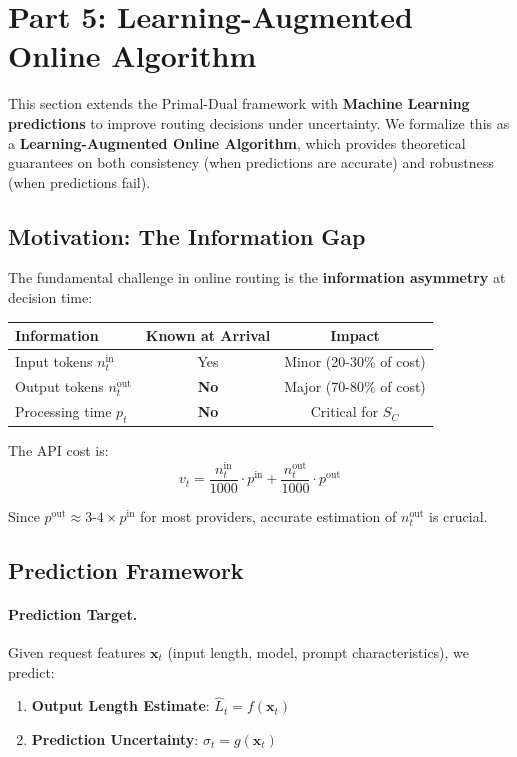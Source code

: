 \documentclass[11pt]{article}
\begin{document}
\section{Part 5: Learning-Augmented Online Algorithm}
\label{sec:part5}

This section extends the Primal-Dual framework with \textbf{Machine Learning predictions} to improve routing decisions under uncertainty. We formalize this as a \textbf{Learning-Augmented Online Algorithm}, which provides theoretical guarantees on both consistency (when predictions are accurate) and robustness (when predictions fail).

\subsection{Motivation: The Information Gap}

The fundamental challenge in online routing is the \textbf{information asymmetry} at decision time:

\begin{center}
\begin{tabular}{|l|c|c|}
\hline
\textbf{Information} & \textbf{Known at Arrival} & \textbf{Impact} \\
\hline
Input tokens $n^{\text{in}}_t$ & Yes & Minor (20-30\% of cost) \\
Output tokens $n^{\text{out}}_t$ & \textbf{No} & Major (70-80\% of cost) \\
Processing time $p_t$ & \textbf{No} & Critical for $S_C$ \\
\hline
\end{tabular}
\end{center}

The API cost is:
\[ v_t = \frac{n^{\text{in}}_t}{1000} \cdot p^{\text{in}} + \frac{n^{\text{out}}_t}{1000} \cdot p^{\text{out}} \]

Since $p^{\text{out}} \approx 3\text{-}4 \times p^{\text{in}}$ for most providers, accurate estimation of $n^{\text{out}}_t$ is crucial.

\subsection{Prediction Framework}

\paragraph{Prediction Target.}
Given request features $\mathbf{x}_t$ (input length, model, prompt characteristics), we predict:
\begin{enumerate}
  \item \textbf{Output Length Estimate}: $\hat{L}_t = f(\mathbf{x}_t)$
  \item \textbf{Prediction Uncertainty}: $\sigma_t = g(\mathbf{x}_t)$
\end{enumerate}
\end{document}

